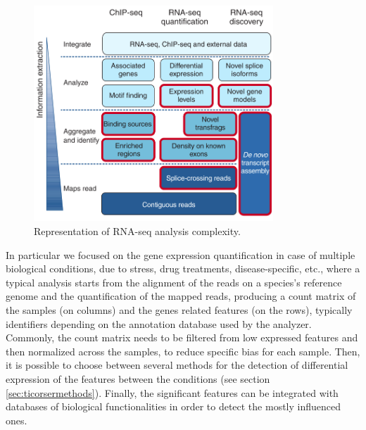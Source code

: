 \begin{figure}[h]
\centering
\includegraphics[width=9cm, keepaspectratio]{img/intro/rna-seqan.png}
\caption[RNA-seq analysis]{Representation of RNA-seq analysis complexity. \cite{Pepke2009}}
\label{fig:rnaseqan}
\end{figure}

In particular we focused on the gene expression quantification in case of multiple biological conditions, due to stress, drug treatments, disease-specific, etc., where a typical analysis starts from the alignment of the reads on a species's reference genome and the quantification of the mapped reads, producing a count matrix of the samples (on columns) and the genes related features (on the rows), typically identifiers depending on the annotation database used by the analyzer.
Commonly, the count matrix needs to be filtered from low expressed features and then normalized across the samples, to reduce specific bias for each sample.
Then, it is possible to choose between several methods for the detection of differential expression of the features between the conditions (see section \ref{sec:ticorsermethods}).
Finally, the significant features can be integrated with databases of biological functionalities in order to detect the mostly influenced ones.

